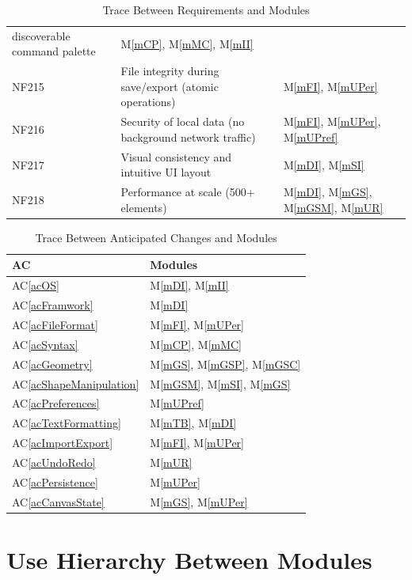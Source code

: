 \documentclass[12pt, titlepage]{article}
\newcommand{\acref}[1]{AC\ref{#1}}
\newcommand{\mref}[1]{M\ref{#1}}
\begin{document}
\begin{table}[H]
\begin{tabular}{p{}p{} p{}}
discoverable command
palette & \mref{mCP}, \mref{mMC}, \mref{mII}\\
NF215 & File integrity during
save/export (atomic
operations)
 & \mref{mFI}, \mref{mUPer}\\
NF216 & Security of local data (no
background network
traffic) & \mref{mFI}, \mref{mUPer}, \mref{mUPref}\\
NF217 & Visual consistency and
intuitive UI layout & \mref{mDI}, \mref{mSI}\\
NF218 & Performance at scale
(500+ elements)
 & \mref{mDI}, \mref{mGS}, \mref{mGSM}, \mref{mUR}\\
\bottomrule
\end{tabular}
\caption{Trace Between Requirements and Modules}
\label{TblRT}
\end{table}

\begin{table}[H]
\centering
\begin{tabular}{p{} p{}}
\toprule
\textbf{AC} & \textbf{Modules}\\
\midrule
\acref{acOS} & \mref{mDI}, \mref{mII} \\
\acref{acFramwork} & \mref{mDI} \\
\acref{acFileFormat} & \mref{mFI}, \mref{mUPer} \\
\acref{acSyntax} & \mref{mCP}, \mref{mMC} \\
\acref{acGeometry} & \mref{mGS}, \mref{mGSP}, \mref{mGSC} \\
\acref{acShapeManipulation} & \mref{mGSM}, \mref{mSI}, \mref{mGS} \\
\acref{acPreferences} & \mref{mUPref} \\
\acref{acTextFormatting} & \mref{mTB}, \mref{mDI} \\
\acref{acImportExport} & \mref{mFI}, \mref{mUPer} \\
\acref{acUndoRedo} & \mref{mUR} \\
\acref{acPersistence} & \mref{mUPer} \\
\acref{acCanvasState} & \mref{mGS}, \mref{mUPer} \\
\bottomrule
\end{tabular}
\caption{Trace Between Anticipated Changes and Modules}
\label{TblACT}
\end{table}

\section{Use Hierarchy Between Modules} \label{SecUse}
\end{document}
